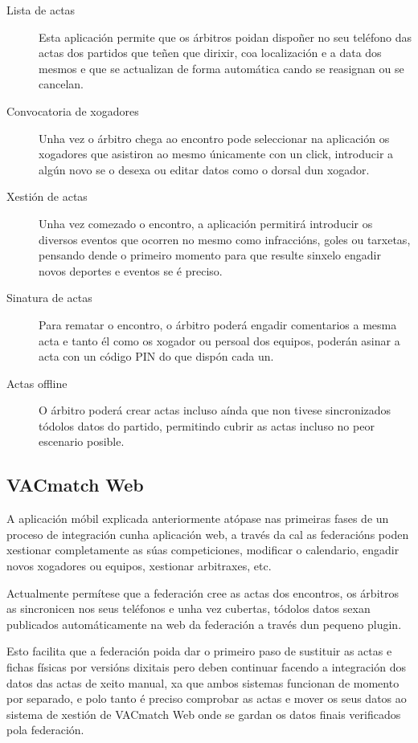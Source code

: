   \begin{description}
    \item [Lista de actas]
    Esta aplicación permite que os árbitros poidan dispoñer no seu teléfono 
das actas dos partidos que teñen que dirixir, coa localización e a data dos 
mesmos e que se actualizan de forma automática cando se reasignan ou se 
cancelan.

    \item [Convocatoria de xogadores]
    Unha vez o árbitro chega ao encontro pode seleccionar na aplicación os 
xogadores que asistiron ao mesmo únicamente con un click, introducir a algún 
novo se o desexa ou editar datos como o dorsal dun xogador.

    \item [Xestión de actas]
    Unha vez comezado o encontro, a aplicación permitirá introducir os diversos 
eventos que ocorren no mesmo como infraccións, goles ou tarxetas, pensando 
dende o primeiro momento para que resulte sinxelo engadir novos deportes e 
eventos se é preciso.

    \item [Sinatura de actas]
    Para rematar o encontro, o árbitro poderá engadir comentarios a mesma acta 
e tanto él como os xogador ou persoal dos equipos, poderán asinar a acta con un 
código PIN do que dispón cada un.

    \item [Actas offline]
    O árbitro poderá crear actas incluso aínda que non tivese sincronizados 
tódolos datos do partido, permitindo cubrir as actas incluso no peor escenario 
posible.

  \end{description} 

    \subsection{VACmatch Web}
    A aplicación móbil explicada anteriormente atópase nas primeiras fases de 
un proceso de integración cunha aplicación web, a través da cal as 
federacións poden xestionar completamente as súas competiciones, modificar o 
calendario, engadir novos xogadores ou equipos, xestionar arbitraxes, etc.

    Actualmente permítese que a federación cree as actas dos encontros, os 
árbitros as sincronicen nos seus teléfonos e unha vez cubertas, tódolos datos 
sexan publicados automáticamente na web da federación a través dun pequeno 
plugin.

    Esto facilita que a federación poida dar o primeiro paso de sustituir as 
actas e fichas físicas por versións dixitais pero deben continuar facendo a 
integración dos datos das actas de xeito manual, xa que ambos sistemas funcionan 
de momento por separado, e polo tanto é preciso comprobar as actas e mover os 
seus datos ao sistema de xestión de VACmatch Web onde se gardan os datos finais 
verificados pola federación.

